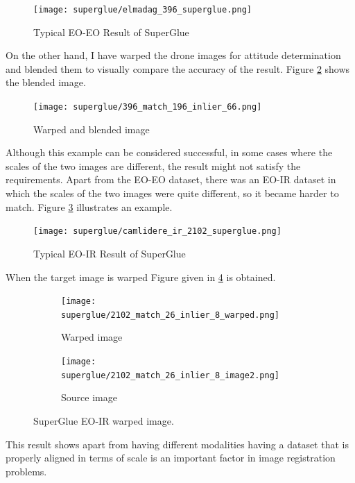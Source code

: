 \documentclass[letterpaper,12pt]{article}
\begin{document}
\begin{figure}[H]
    \centering
    \texttt{[image: superglue/elmadag\_396\_superglue.png]}
    \caption{Typical EO-EO Result of SuperGlue}
    \label{eo-eo-superglue_0}
\end{figure} 
On the other hand, I have warped the drone images for attitude determination and blended them to visually compare the accuracy of the result. Figure \ref{fig:eo-eo-superglue_0_blended} shows the blended image.
\begin{figure}[H]
    \centering
    \texttt{[image: superglue/396\_match\_196\_inlier\_66.png]}
    \caption{Warped and blended image}
    \label{fig:eo-eo-superglue_0_blended}
\end{figure} 
Although this example can be considered successful, in some cases where the scales of the two images are different, the result might not satisfy the requirements. Apart from the EO-EO dataset, there was an EO-IR dataset in which the scales of the two images were quite different, so it became harder to match. Figure \ref{fig:eo-ir-superglue_1} illustrates an example. 

\begin{figure}[H]
    \centering
    \texttt{[image: superglue/camlidere\_ir\_2102\_superglue.png]}
    \caption{Typical EO-IR Result of SuperGlue}
    \label{fig:eo-ir-superglue_1}
\end{figure} 
When the target image is warped Figure given in \ref{fig:eo-ir-superglue_1_warped} is obtained.

\begin{figure}[H]
    \centering
    \begin{subfigure}{.4\textwidth}

    \texttt{[image: superglue/2102\_match\_26\_inlier\_8\_warped.png]}
    \caption{Warped image}
    \label{fig:eo-ir-superglue_1_warped}
    \end{subfigure}
    \begin{subfigure}{.4\textwidth}
    \texttt{[image: superglue/2102\_match\_26\_inlier\_8\_image2.png]}
    
    \caption{Source image}
    \label{fig:eo-ir-superglue_1_warped_0}
    \end{subfigure}
    \caption{SuperGlue EO-IR warped image.}

\end{figure} 

This result shows apart from having different modalities having a dataset that is properly aligned in terms of scale is an important factor in image registration problems.
\end{document}
